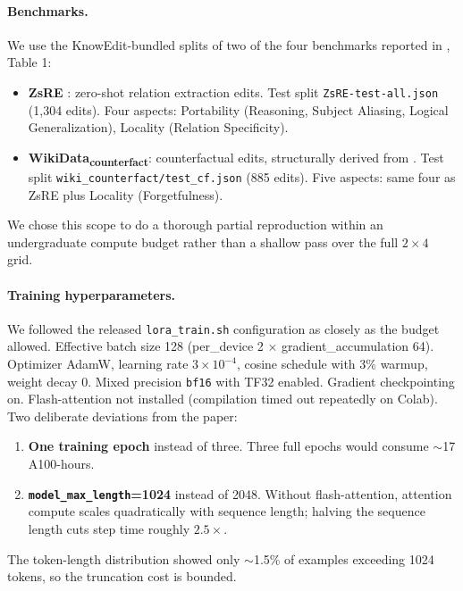 \documentclass[11pt,a4paper,twocolumn]{article}
\begin{document}
\paragraph{Benchmarks.} We use the KnowEdit-bundled splits of two of the four benchmarks reported in \citet{jiang2024learning}, Table 1:
\begin{itemize}[leftmargin=1em,itemsep=0pt,topsep=2pt]
\item \textbf{ZsRE} \citep{levy2017zsre}: zero-shot relation extraction edits. Test split \texttt{ZsRE-test-all.json} (1{,}304 edits). Four aspects: Portability (Reasoning, Subject Aliasing, Logical Generalization), Locality (Relation Specificity).
\item \textbf{WikiData}\textsubscript{\textbf{counterfact}}: counterfactual edits, structurally derived from \citet{cohen2023ripple}. Test split \texttt{wiki\_counterfact/test\_cf.json} (885 edits). Five aspects: same four as ZsRE plus Locality (Forgetfulness).
\end{itemize}
We chose this scope to do a thorough partial reproduction within an undergraduate compute budget rather than a shallow pass over the full $2 \times 4$ grid.

\paragraph{Training hyperparameters.} We followed the released \texttt{lora\_train.sh} configuration as closely as the budget allowed. Effective batch size 128 (per\_device 2 $\times$ gradient\_accumulation 64). Optimizer AdamW, learning rate $3 \times 10^{-4}$, cosine schedule with 3\% warmup, weight decay 0. Mixed precision \texttt{bf16} with TF32 enabled. Gradient checkpointing on. Flash-attention not installed (compilation timed out repeatedly on Colab). Two deliberate deviations from the paper:
\begin{enumerate}[leftmargin=1.2em,itemsep=0pt,topsep=2pt]
\item \textbf{One training epoch} instead of three. Three full epochs would consume $\sim$17 A100-hours.
\item \textbf{\texttt{model\_max\_length}=1024} instead of 2048. Without flash-attention, attention compute scales quadratically with sequence length; halving the sequence length cuts step time roughly $2.5\times$.
\end{enumerate}
The token-length distribution showed only $\sim$1.5\% of examples exceeding 1024 tokens, so the truncation cost is bounded.
\end{document}

